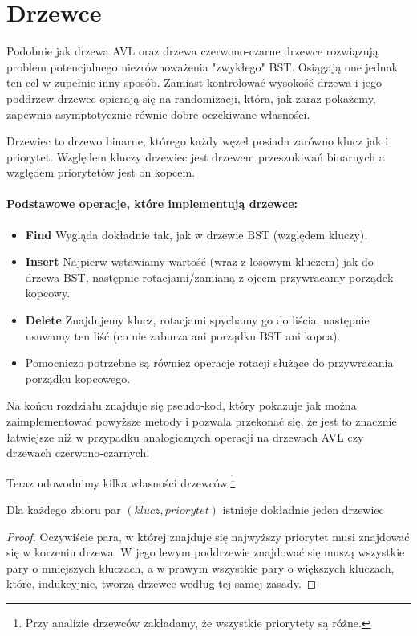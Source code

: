 \section{Drzewce}

\label{sec:drzewce}

Podobnie jak drzewa AVL oraz drzewa czerwono-czarne drzewce rozwiązują problem potencjalnego niezrównoważenia "zwykłego" BST.
Osiągają one jednak ten cel w zupełnie inny sposób.
Zamiast kontrolować wysokość drzewa i jego poddrzew drzewce opierają się na randomizacji, która, jak zaraz pokażemy, zapewnia asymptotycznie równie dobre oczekiwane własności. 

\begin{definition} 
Drzewiec to drzewo binarne, którego każdy węzeł posiada zarówno klucz jak i priorytet.
Względem kluczy drzewiec jest drzewem przeszukiwań binarnych a względem priorytetów jest on kopcem.
\end{definition}

\paragraph{Podstawowe operacje, które implementują drzewce:}
\begin{itemize}
    \item \textbf{Find} Wygląda dokładnie tak, jak w drzewie BST (względem kluczy).
    \item \textbf{Insert} Najpierw wstawiamy wartość (wraz z losowym kluczem) jak do drzewa BST, następnie rotacjami/zamianą z ojcem przywracamy porządek kopcowy.
    \item \textbf{Delete} Znajdujemy klucz, rotacjami spychamy go do liścia, następnie usuwamy ten liść (co nie zaburza ani porządku BST ani kopca).
    \item Pomocniczo potrzebne są również operacje rotacji służące do przywracania porządku kopcowego.
\end{itemize}

Na końcu rozdziału znajduje się pseudo-kod, który pokazuje jak można zaimplementować powyższe metody i pozwala przekonać się, że jest to znacznie łatwiejsze niż w przypadku analogicznych operacji na drzewach AVL czy drzewach czerwono-czarnych.

Teraz udowodnimy kilka własności drzewców.\footnote{Przy analizie drzewców zakładamy, że wszystkie priorytety są różne.}

\begin{theorem}
\label{unique treap}
 Dla każdego zbioru par $(klucz, priorytet)$ istnieje dokładnie jeden drzewiec
\end{theorem}
\begin{proof}
Oczywiście para, w której znajduje się najwyższy priorytet musi znajdować się w korzeniu drzewa.
W jego lewym poddrzewie znajdować się muszą wszystkie pary o mniejszych kluczach, a w prawym wszystkie pary o większych kluczach, które, indukcyjnie, tworzą drzewce według tej samej zasady.
\end{proof}

